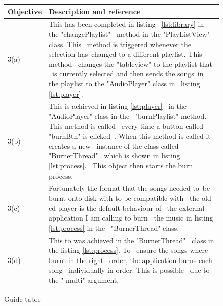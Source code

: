 \documentclass{article}
\begin{document}
\begin{figure}[H]
    \begin{tabular} {| p{2cm} | p{10cm} |}
        \hline
        \textbf{Objective}   &         \textbf{Description and reference}   \\ \hline
        3(a)                 &This has been completed in listing            \
                              \ref{lst:library} in the "changePlaylist"     \
                              method in the "PlayListView" class. This      \
                              method is triggered whenever the selection has\
                              changed to a different playlist. This method  \
                              changes the "tableview" to the playlist that  \
                              is currently selected and then sends the songs\
                              in the playlist to the "AudioPlayer" class in \
                              listing \ref{lst:player}.                     \\ \hline
        3(b)                 &This is achieved in listing \ref{lst:player}  \
                              in the "AudioPlayer" class in the             \
                              "burnPlaylist" method. This method is called  \
                              every time a button called "burnBtn" is clicked\
                              . When this method is called it creates a new \
                              instance of the class called "BurnerThread"   \
                              which is shown in listing \ref{lst:process}.  \
                              This object then starts the burn process.     \\ \hline
        3(c)                 &Fortunately the format that the songs needed to\
                              be burnt onto disk with to be compatible with \
                              the old cd player is the default behaviour of \
                              the external application I am calling to burn \
                              the music in listing \ref{lst:process} in the \
                              "BurnerThread" class.                         \\ \hline
        3(d)                 &This to was achieved in the "BurnerThread"    \
                               class in the listing \ref{lst:process}. To   \
                               ensure the songs where burnt in the right    \
                               order, the application burns each song       \
                               individually in order. This is possible      \
                               due to the "-multi" argument.                \\ \hline
    \end{tabular}
    \caption{Guide table} \label{fig:guideTable}
\end{figure}
\end{document}
